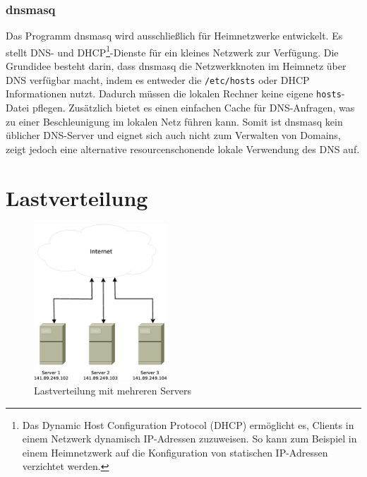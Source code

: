 \documentclass[a4paper, 12pt, BCOR10mm, DIV12, toc=bibliography, toc=listof, german]{scrbook}
\begin{document}

				\subsubsection*{dnsmasq} %

				Das Programm dnsmasq \cite{dnsmasq} wird ausschließlich für Heimnetzwerke entwickelt. Es
				stellt DNS- und DHCP\footnote{Das Dynamic Host Configuration Protocol (DHCP) \cite{rfc2131}
				ermöglicht es, Clients in einem Netzwerk dynamisch IP-Adressen zuzuweisen. So kann zum
				Beispiel in einem Heimnetzwerk auf die Konfiguration von statischen IP-Adressen verzichtet
				werden.}-Dienste für ein kleines Netzwerk zur Verfügung. Die Grundidee besteht darin, dass dnsmasq
				die Netzwerkknoten im Heimnetz über DNS verfügbar macht, indem es entweder die
				\texttt{/etc/hosts} oder DHCP Informationen nutzt. Dadurch müssen die lokalen Rechner keine
				eigene \texttt{hosts}-Datei pflegen.  Zusätzlich bietet es einen einfachen Cache für
				DNS-Anfragen, was zu einer Beschleunigung im lokalen Netz führen kann. Somit ist dnsmasq
				kein üblicher DNS-Server und eignet sich auch nicht zum Verwalten von Domains, zeigt jedoch
				eine alternative resourcenschonende lokale Verwendung des DNS auf.




		\section{Lastverteilung} %
		\label{sec:lastverteilung}

		\begin{figure}
			\centering
			\includegraphics[width=5cm]{images/internet-server}
			\caption{Lastverteilung mit mehreren Servers}
			\label{fig:lastverteilung}
		\end{figure}
\end{document}
